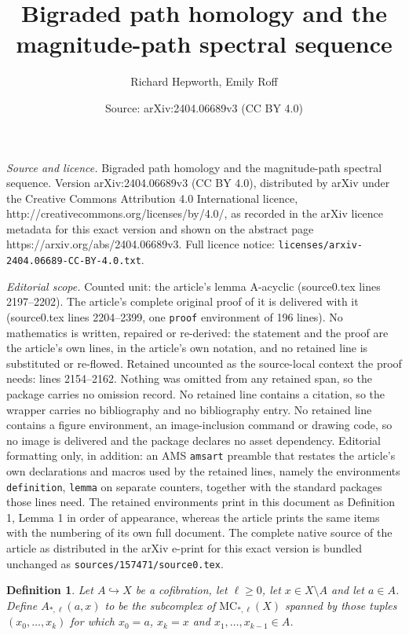 \documentclass[10pt,a4paper]{amsart}
\title{Bigraded path homology and the magnitude-path spectral sequence}
\author{Richard Hepworth, Emily Roff}
\date{Source: arXiv:2404.06689v3 (CC BY 4.0)}
\newtheorem{definition}{Definition}
\newcommand{\MC}{\mathrm{MC}}
\begin{document}
\maketitle

\noindent\emph{Source and licence.} Bigraded path homology and the magnitude-path spectral sequence. Version arXiv:2404.06689v3 (CC BY 4.0), distributed by arXiv under the Creative Commons Attribution 4.0 International licence, http://creativecommons.org/licenses/by/4.0/, as recorded in the arXiv licence metadata for this exact version and shown on the abstract page https://arxiv.org/abs/2404.06689v3. Full licence notice: \texttt{licenses/arxiv-2404.06689-CC-BY-4.0.txt}.\par\smallskip

\noindent\textit{Editorial scope.} Counted unit: the article's lemma A-acyclic (source0.tex lines 2197--2202). The article's complete original proof of it is delivered with it (source0.tex lines 2204--2399, one \texttt{proof} environment of 196 lines). No mathematics is written, repaired or re-derived: the statement and the proof are the article's own lines, in the article's own notation, and no retained line is substituted or re-flowed.  Retained uncounted as the source-local context the proof needs: lines 2154--2162.  Nothing was omitted from any retained span, so the package carries no omission record.  No retained line contains a citation, so the wrapper carries no bibliography and no bibliography entry.  No retained line contains a figure environment, an image-inclusion command or drawing code, so no image is delivered and the package declares no asset dependency.  Editorial formatting only, in addition: an AMS \texttt{amsart} preamble that restates the article's own declarations and macros used by the retained lines, namely the environments \texttt{definition}, \texttt{lemma} on separate counters, together with the standard packages those lines need.  The retained environments print in this document as Definition 1, Lemma 1 in order of appearance, whereas the article prints the same items with the numbering of its own full document.  The complete native source of the article as distributed in the arXiv e-print for this exact version is bundled unchanged as \texttt{sources/157471/source0.tex}.
\begin{definition}\label{definition-A}
    Let $A\hookrightarrow X$ be a cofibration,
    let $\ell\geq 0$, let $x\in X\setminus A$
    and let $a\in A$.
    Define $A_{\ast,\ell}(a,x)$ to be the subcomplex of
    $\MC_{\ast,\ell}(X)$ spanned by those tuples
    $(x_0,\ldots,x_k)$ 
    for which $x_0=a$, $x_k=x$ and $x_1,\ldots,x_{k-1}\in A$.
\end{definition}
\end{document}
